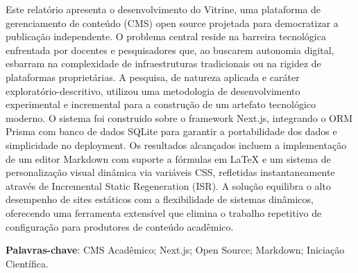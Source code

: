 \begin{resumo}
    Este relatório apresenta o desenvolvimento do Vitrine, uma plataforma de gerenciamento de conteúdo (CMS) open source projetada para democratizar a publicação independente. O problema central reside na barreira tecnológica enfrentada por docentes e pesquisadores que, ao buscarem autonomia digital, esbarram na complexidade de infraestruturas tradicionais ou na rigidez de plataformas proprietárias. A pesquisa, de natureza aplicada e caráter exploratório-descritivo, utilizou uma metodologia de desenvolvimento experimental e incremental para a construção de um artefato tecnológico moderno. O sistema foi construido sobre o framework Next.js, integrando o ORM Prisma com banco de dados SQLite para garantir a portabilidade dos dados e simplicidade no deployment. Os resultados alcançados incluem a implementação de um editor Markdown com suporte a fórmulas em LaTeX e um sistema de personalização visual dinâmica via variáveis CSS, refletidas instantaneamente através de Incremental Static Regeneration (ISR). A solução equilibra o alto desempenho de sites estáticos com a flexibilidade de sistemas dinâmicos, oferecendo uma ferramenta extensível que elimina o trabalho repetitivo de configuração para produtores de conteúdo acadêmico.

    \vspace{\onelineskip}
    \noindent
    \textbf{Palavras-chave}: CMS Acadêmico; Next.js; Open Source; Markdown; Iniciação Científica.
\end{resumo}





